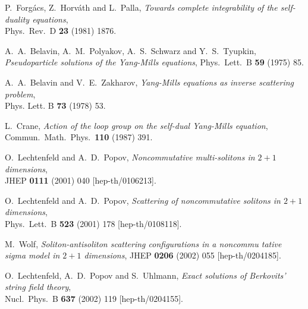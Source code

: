 \documentclass[a4paper,11pt,english]{article}
\numberwithin{equation}{section}
\renewcommand{\=}{\ =\ }
\begin{document}
\begin{thebibliography}{99}
         P.~Forg\'acs, Z.~Horv\'ath and L.~Palla,
         {\em Towards complete integrability of the self-duality equations},\\
         Phys.\ Rev.\ D {\bf 23} (1981) 1876.

         A.~A.~Belavin, A.~M.~Polyakov, A.~S.~Schwarz and Y.~S.~Tyupkin,\\
         {\em Pseudoparticle solutions of the Yang-Mills equations},
         Phys.\ Lett.\ B {\bf 59} (1975) 85.

         A.~A.~Belavin and V.~E.~Zakharov,
         {\em Yang-Mills equations as inverse scattering problem},\\
         Phys. Lett. B {\bf 73} (1978) 53.

       L.~Crane,
       {\em Action of the loop group on the self-dual Yang-Mills equation},\\
       Commun.\ Math.\ Phys.\  {\bf 110} (1987) 391.

         O.~Lechtenfeld and A.~D.~Popov,
         {\em Noncommutative multi-solitons in $2{+}1$ dimensions},\\
         JHEP {\bf 0111} (2001) 040
         [hep-th/0106213].

         O.~Lechtenfeld and A.~D.~Popov,
         {\em Scattering of noncommutative solitons in $2{+}1$ dimensions},\\
         Phys.\ Lett.\ B {\bf 523} (2001) 178
         [hep-th/0108118].

         M.~Wolf,
         {\em Soliton-antisoliton scattering configurations in a noncommu%
tative sigma model in $2{+}1$ dimensions},
         JHEP {\bf 0206} (2002) 055
         [hep-th/0204185].

         O.~Lechtenfeld, A.~D.~Popov and S.~Uhlmann,
         {\em Exact solutions of Berkovits' string field theory},\\
         Nucl.\ Phys.\ B {\bf 637} (2002) 119
         [hep-th/0204155].


\end{thebibliography}
\end{document}
